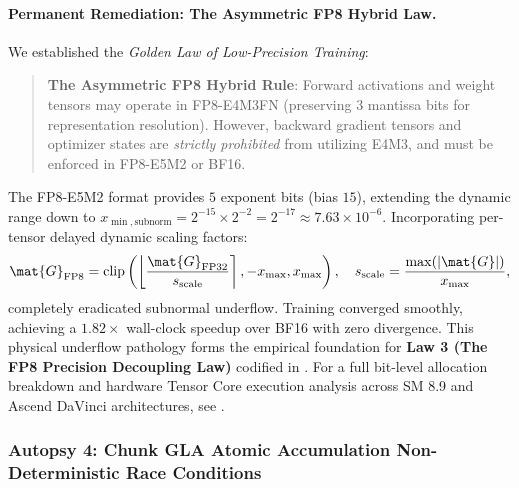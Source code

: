 \paragraph{Permanent Remediation: The Asymmetric FP8 Hybrid Law.}
We established the \emph{\neuralops{} Golden Law of Low-Precision Training}:
\begin{quote}
\textbf{The Asymmetric FP8 Hybrid Rule}: Forward activations and weight tensors may operate in FP8-E4M3FN (preserving 3 mantissa bits for representation resolution). However, backward gradient tensors and optimizer states are \emph{strictly prohibited} from utilizing E4M3, and must be enforced in FP8-E5M2 or BF16.
\end{quote}
The FP8-E5M2 format provides $5$ exponent bits (bias $15$), extending the dynamic range down to $x_{\min, \text{subnorm}} = 2^{-15} \times 2^{-2} = 2^{-17} \approx 7.63 \times 10^{-6}$. Incorporating per-tensor delayed dynamic scaling factors:
\begin{equation}
\mat{G}_{\text{FP8}} = \operatorname{clip}\left(\left\lfloor \frac{\mat{G}_{\text{FP32}}}{s_{\text{scale}}} \right\rceil, -x_{\max}, x_{\max}\right), \quad s_{\text{scale}} = \frac{\max(|\mat{G}|)}{x_{\max}},
\end{equation}
completely eradicated subnormal underflow. Training converged smoothly, achieving a $1.82\times$ wall-clock speedup over BF16 with zero divergence. This physical underflow pathology forms the empirical foundation for \textbf{Law 3 (The FP8 Precision Decoupling Law)} codified in . For a full bit-level allocation breakdown and hardware Tensor Core execution analysis across SM 8.9 and Ascend DaVinci architectures, see .

\subsubsection{Autopsy 4: Chunk GLA Atomic Accumulation Non-Deterministic Race Conditions}
\label{sec:autopsy_chunk_gla_atomic}

